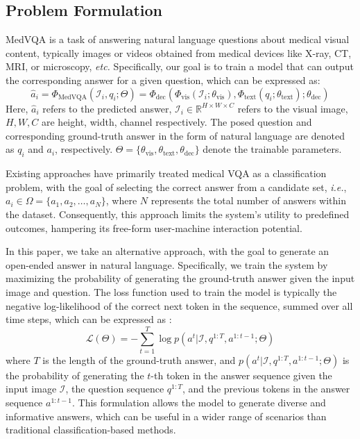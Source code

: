 \documentclass{article}
\begin{document}
\subsection{Problem Formulation}
\label{sec:problem}

MedVQA is a task of answering natural language questions about medical visual content, 
typically images or videos obtained from medical devices like X-ray, CT, MRI, or microscopy, {\em etc.}
Specifically, our goal is to train a model that can output the corresponding answer for a given question, which can be expressed as:
\begin{equation}
    \hat{a}_i = \Phi_{\text{MedVQA}}(\mathcal{I}_i, q_i; \Theta) = \Phi_{\text{dec}}(\Phi_{\text{vis}}(\mathcal{I}_i; \theta_{\text{vis}}), \Phi_{\text{text}}(q_i; \theta_{\text{text}}); \theta_{\text{dec}}) 
\end{equation}
Here, $\hat{a}_i$ refers to the predicted answer,
$\mathcal{I}_i \in \mathbb{R}^{H \times W \times C}$ refers to the visual image, $H,W,C$ are height, width, channel respectively. 
The posed question and corresponding ground-truth answer in the form of natural language are denoted as $q_i$ and $a_i$, respectively. $\Theta = \{\theta_{\text{vis}}, \theta_{\text{text}}, \theta_{\text{dec}}\}$ denote the trainable parameters. 

Existing approaches have primarily treated medical VQA as a classification problem, with the goal of selecting the correct answer from a candidate set, {\em i.e.}, $a_i \in \Omega = \{a_1, a_2, \dots, a_N\}$, where $N$ represents the total number of answers within the dataset. Consequently, 
this approach limits the system's utility to predefined outcomes, hampering its free-form user-machine interaction potential.



In this paper, we take an alternative approach, 
with the goal to generate an open-ended answer in natural language.
Specifically, we train the system by maximizing the probability of generating the ground-truth answer given the input image and question. The loss function used to train the model is typically the negative log-likelihood of the correct next token in the sequence, summed over all time steps, which can be expressed as : 
\begin{equation}
\mathcal{L}(\Theta) = -\sum_{t=1}^{T} \log p(a^t|\mathcal{I}, q^{1:T}, a^{1:t-1}; \Theta)
\end{equation}
where $T$ is the length of the ground-truth answer, and $p(a^t|\mathcal{I}, q^{1:T}, a^{1:t-1}; \Theta)$ is the probability of generating the $t$-th token in the answer sequence given the input image $\mathcal{I}$, the question sequence $q^{1:T}$, and the previous tokens in the answer sequence $a^{1:t-1}$. 
This formulation allows the model to generate diverse and informative answers, which can be useful in a wider range of scenarios than traditional classification-based methods.
\end{document}
